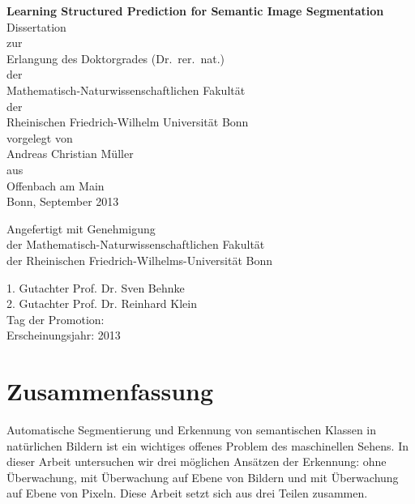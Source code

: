 \documentclass[12pt,toc=bibnumbered, a4paper,twoside,DIV=11,BCOR=.5cm]{scrbook}
\begin{document}
\begin{spacing}{1.6}
\begin{titlepage}

\begin{center}
\Large\sffamily
\vspace*{1cm}
\textbf{{\huge Learning Structured Prediction for Semantic Image Segmentation}}\\[5mm]
Dissertation\\
zur\\
Erlangung des Doktorgrades (Dr.\ rer.\ nat.)\\
der\\
Mathematisch-Naturwissenschaftlichen Fakult\"at\\
der\\
Rheinischen Friedrich-Wilhelm Universit\"at Bonn\\
vorgelegt von\\
{\LARGE Andreas Christian M\"uller}\\
aus\\
Offenbach am Main\\
Bonn, September 2013
\end{center}
\end{titlepage}
%
\clearpage
{}
\setcounter{page}{2}
\vspace*{5cm}
\Large\sffamily
\begin{center}
Angefertigt mit Genehmigung\\
der Mathematisch-Naturwissenschaftlichen Fakult\"at\\
der Rheinischen Friedrich-Wilhelms-Universit\"at Bonn\\
\end{center}
1. Gutachter Prof. Dr. Sven Behnke\\
2. Gutachter Prof. Dr. Reinhard Klein\\
Tag der Promotion:\\
Erscheinungsjahr: 2013\\
\end{spacing}
\tableofcontents
\chapter*{Zusammenfassung}
\enlargethispage{10mm}
Automatische Segmentierung und Erkennung von semantischen Klassen in
nat\"urlichen Bildern ist ein wichtiges offenes Problem des maschinellen Sehens.
In dieser Arbeit untersuchen wir drei m\"oglichen Ans\"atzen der Erkennung:
ohne \"Uberwachung, mit \"Uberwachung auf Ebene von Bildern und mit \"Uberwachung auf Ebene
von Pixeln. Diese Arbeit setzt sich aus drei Teilen zusammen.
\end{document}
